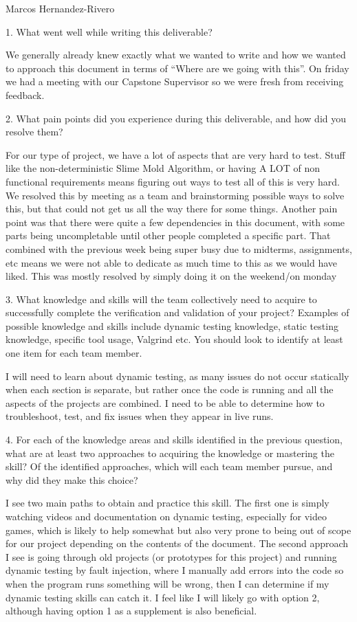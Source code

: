\documentclass[12pt, titlepage]{article}
\begin{document}
Marcos Hernandez-Rivero

1. What went well while writing this deliverable?

We generally already knew exactly what we wanted to write and how we wanted to approach this document in terms of “Where are we going with this”. On friday we had a meeting with our Capstone Supervisor so we were fresh from receiving feedback.

2. What pain points did you experience during this deliverable, and how did you resolve them?

For our type of project, we have a lot of aspects that are very hard to test. Stuff like the non-deterministic Slime Mold Algorithm, or having A LOT of non functional requirements means figuring out ways to test all of this is very hard. We resolved this by meeting as a team and brainstorming possible ways to solve this, but that could not get us all the way there for some things. Another pain point was that there were quite a few dependencies in this document, with some parts being uncompletable until other people completed a specific part. That combined with the previous week being super busy due to midterms, assignments, etc means we were not able to dedicate as much time to this as we would have liked. This was mostly resolved by simply doing it on the weekend/on monday

3. What knowledge and skills will the team collectively need to acquire to successfully complete the verification and validation of your project? Examples of possible knowledge and skills include dynamic testing knowledge, static testing knowledge, specific tool usage, Valgrind etc. You should look to identify at least one item for each team member.

I will need to learn about dynamic testing, as many issues do not occur statically when each section is separate, but rather once the code is running and all the aspects of the projects are combined. I need to be able to determine how to troubleshoot, test, and fix issues when they appear in live runs.

4. For each of the knowledge areas and skills identified in the previous question, what are at least two approaches to acquiring the knowledge or mastering the skill? Of the identified approaches, which will each team member pursue, and why did they make this choice?

I see two main paths to obtain and practice this skill. The first one is simply watching videos and documentation on dynamic testing, especially for video games, which is likely to help somewhat but also very prone to being out of scope for our project depending on the contents of the document. The second approach I see is going through old projects (or prototypes for this project) and running dynamic testing by fault injection, where I manually add errors into the code so when the program runs something will be wrong, then I can determine if my dynamic testing skills can catch it. I feel like I will likely go with option 2, although having option 1 as a supplement is also beneficial.
\end{document}
